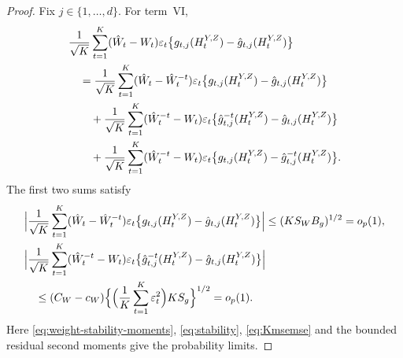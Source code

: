 \documentclass[12pt]{article}
\numberwithin{equation}{section}
\begin{document}
\begin{proof}
Fix \(j\in\{1,\ldots,d\}\). For term~\(\mathrm{VI}\),
\begin{align}
&\frac1{\sqrt K}\sum_{t=1}^K
(\hat W_t-W_t)\varepsilon_t
\big\{g_{t,j}(H_t^{Y,Z})-\hat g_{t,j}(H_t^{Y,Z})\big\}
\notag\\
&\quad=\frac1{\sqrt K}\sum_{t=1}^K
(\hat W_t-\hat W_t^{-t})\varepsilon_t
\big\{g_{t,j}(H_t^{Y,Z})-\hat g_{t,j}(H_t^{Y,Z})\big\}
\notag\\
&\qquad{}+\frac1{\sqrt K}\sum_{t=1}^K
(\hat W_t^{-t}-W_t)\varepsilon_t
\big\{\hat g_{t,j}^{-t}(H_t^{Y,Z})
-\hat g_{t,j}(H_t^{Y,Z})\big\}
\notag\\
&\qquad{}+\frac1{\sqrt K}\sum_{t=1}^K
(\hat W_t^{-t}-W_t)\varepsilon_t
\big\{g_{t,j}(H_t^{Y,Z})
-\hat g_{t,j}^{-t}(H_t^{Y,Z})\big\}.
\label{eq:weight-interaction-first-deletion}
\end{align}
The first two sums satisfy
\begin{align}
&\Big|\frac1{\sqrt K}\sum_{t=1}^K
(\hat W_t-\hat W_t^{-t})\varepsilon_t
\big\{g_{t,j}(H_t^{Y,Z})-\hat g_{t,j}(H_t^{Y,Z})\big\}\Big|
\leq(KS_WB_g)^{1/2}=o_p(1),
\label{eq:weight-interaction-first-weight-bound}\\
&\Big|\frac1{\sqrt K}\sum_{t=1}^K
(\hat W_t^{-t}-W_t)\varepsilon_t
\big\{\hat g_{t,j}^{-t}(H_t^{Y,Z})
-\hat g_{t,j}(H_t^{Y,Z})\big\}\Big|\notag\\
&\quad\leq(C_W-c_W)
\Big\{\Big(\frac1K\sum_{t=1}^K\varepsilon_t^2\Big)
KS_g\Big\}^{1/2}
=o_p(1).
\label{eq:weight-interaction-first-nuisance-bound}
\end{align}
Here \eqref{eq:weight-stability-moments}, \eqref{eq:stability},
\eqref{eq:Kmsemse} and the bounded residual second moments give
the probability limits.


\end{proof}
\end{document}
